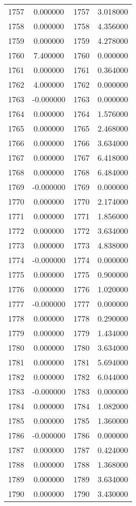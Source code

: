 \documentclass[12pt]{article}
\begin{document}
\begin{longtable}{@{}cccc@{}}
1757 & 0.000000 & 1757 & 3.018000 \\
1758 & 0.000000 & 1758 & 4.356000 \\
1759 & 0.000000 & 1759 & 4.278000 \\
1760 & 7.400000 & 1760 & 0.000000 \\
1761 & 0.000000 & 1761 & 0.364000 \\
1762 & 4.000000 & 1762 & 0.000000 \\
1763 & -0.000000 & 1763 & 0.000000 \\
1764 & 0.000000 & 1764 & 1.576000 \\
1765 & 0.000000 & 1765 & 2.468000 \\
1766 & 0.000000 & 1766 & 3.634000 \\
1767 & 0.000000 & 1767 & 6.418000 \\
1768 & 0.000000 & 1768 & 6.484000 \\
1769 & -0.000000 & 1769 & 0.000000 \\
1770 & 0.000000 & 1770 & 2.174000 \\
1771 & 0.000000 & 1771 & 1.856000 \\
1772 & 0.000000 & 1772 & 3.634000 \\
1773 & 0.000000 & 1773 & 4.838000 \\
1774 & -0.000000 & 1774 & 0.000000 \\
1775 & 0.000000 & 1775 & 0.900000 \\
1776 & 0.000000 & 1776 & 1.020000 \\
1777 & -0.000000 & 1777 & 0.000000 \\
1778 & 0.000000 & 1778 & 0.290000 \\
1779 & 0.000000 & 1779 & 1.434000 \\
1780 & 0.000000 & 1780 & 3.634000 \\
1781 & 0.000000 & 1781 & 5.694000 \\
1782 & 0.000000 & 1782 & 6.044000 \\
1783 & -0.000000 & 1783 & 0.000000 \\
1784 & 0.000000 & 1784 & 1.082000 \\
1785 & 0.000000 & 1785 & 1.360000 \\
1786 & -0.000000 & 1786 & 0.000000 \\
1787 & 0.000000 & 1787 & 0.424000 \\
1788 & 0.000000 & 1788 & 1.368000 \\
1789 & 0.000000 & 1789 & 3.634000 \\
1790 & 0.000000 & 1790 & 3.430000 \\

\end{longtable}
\end{document}
